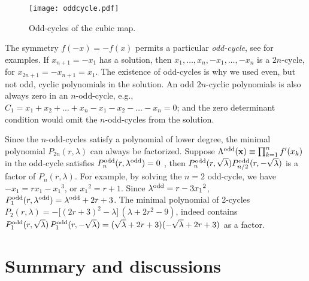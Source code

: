\documentclass{ws-ijbc}
\begin{document}

%
%
\begin{figure}[h]
  \begin{center}
  \begin{minipage}{\linewidth}
        \texttt{[image: oddcycle.pdf]}
  \end{minipage}%
  \end{center}
  \caption{\label{fig:oddcycle}
  Odd-cycles of the cubic map.}
\end{figure}
%
%

The symmetry $f(-x) = -f(x)$ permits
  a particular \emph{odd-cycle},
  see  for examples.
If $x_{n+1} = -x_1$ has a solution,
  then $x_1, \ldots, x_{n}, -x_1, \ldots, -x_{n}$
  is a $2n$-cycle, for $x_{2n+1} = - x_{n+1} = x_1$.
%
The existence of odd-cycles is why we used even, but not odd, cyclic polynomials
  in the solution.
An odd $2n$-cyclic polynomials is also always zero
  in an $n$-odd-cycle,
e.g., $C_1 = x_1 + x_2 + \dots + x_n - x_1 - x_2 - \dots - x_n = 0$;
and the zero determinant condition 
  would omit the $n$-odd-cycles from the solution.


Since the $n$-odd-cycles satisfy a polynomial of lower degree,
  the minimal polynomial $P_{2n}(r, \lambda)$
  can always be factorized.
%
Suppose $\Lambda^{\mathrm{odd}}(\mathbf{x}) \equiv \prod_{k = 1}^{n} f'(x_k)$ in the odd-cycle
 satisfies $P_{n}^{\mathrm{odd}}(r, \lambda^{\mathrm{odd}}) = 0$
\big[where $\lambda^\odd$ is the value of $\Lambda^\odd(\vx)$,
and $\lambda^\odd = \pm\sqrt \lambda$\,\big],
then $P^{\mathrm{odd}}_{n}(r, \sqrt \lambda) P^{\mathrm{odd}}_{n/2}(r, -\sqrt \lambda)$
is a factor of $P_{n}(r, \lambda)$.
%
For example, by solving the $n = 2$ odd-cycle,
  we have $- x_1 = r x_1 - {x_1}^3$, or ${x_1}^2 = r + 1$.
Since $\lambda^{\mathrm{odd}} = r - 3 {x_1}^2$,
$P^{\mathrm{odd}}_1(r, \lambda^{\mathrm{odd}}) = \lambda^{\mathrm{odd}} + 2 r + 3$.
%
The minimal polynomial of 2-cycles
  $P_2(r,\lambda) = -\big[(2r+3)^2 - \lambda\big]\,(\lambda + 2r^2-9)$,
  indeed contains
  $P^{\mathrm{odd}}_1(r, \sqrt \lambda) \, P^{\mathrm{odd}}_1(r, -\sqrt \lambda)
   = (\sqrt \lambda + 2 r + 3)(-\sqrt \lambda + 2 r + 3)$
  as a factor.




\section{\label{sec:end}Summary and discussions}
\end{document}
